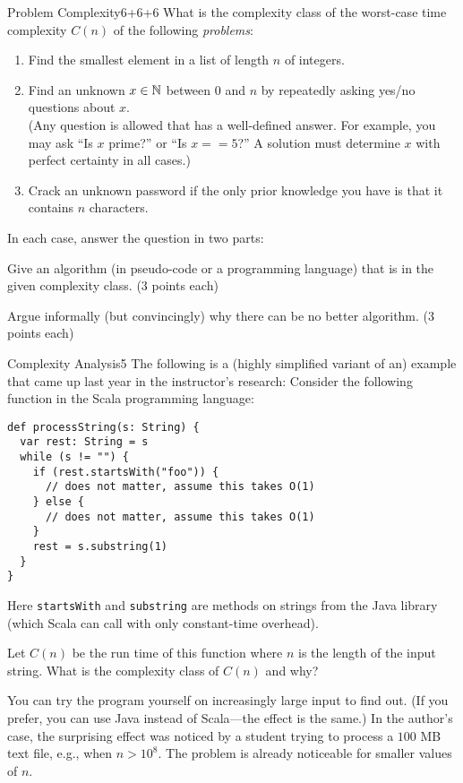 \documentclass[a4paper]{article}
\begin{document}
\header

\begin{problem}{Problem Complexity}{6+6+6}
What is the complexity class of the worst-case time complexity $C(n)$ of the following \emph{problems}:
\begin{enumerate}
\item Find the smallest element in a list of length $n$ of integers.
\item Find an unknown $x\in \mathbb{N}$ between $0$ and $n$ by repeatedly asking yes/no questions about $x$.\\
(Any question is allowed that has a well-defined answer. For example, you may ask ``Is $x$ prime?'' or ``Is $x==5$?'' A solution must determine $x$ with perfect certainty in all cases.)
\item Crack an unknown password if the only prior knowledge you have is that it contains $n$ characters.
\end{enumerate}

In each case, answer the question in two parts:
\begin{compactitem}
\item Give an algorithm (in pseudo-code or a programming language) that is in the given complexity class. (3 points each)
\item Argue informally (but convincingly) why there can be no better algorithm. (3 points each)
\end{compactitem}
\end{problem}

\begin{problem}{Complexity Analysis}{5}
The following is a (highly simplified variant of an) example that came up last year in the instructor's research:
Consider the following function in the Scala programming language:

\begin{lstlisting}
def processString(s: String) {
  var rest: String = s
  while (s != "") {
    if (rest.startsWith("foo")) {
      // does not matter, assume this takes O(1)
    } else {
      // does not matter, assume this takes O(1)
    }
    rest = s.substring(1)
  }
}
\end{lstlisting}
Here \lstinline|startsWith| and \lstinline|substring| are methods on strings from the Java library (which Scala can call with only constant-time overhead).

Let $C(n)$ be the run time of this function where $n$ is the length of the input string.
What is the complexity class of $C(n)$ and why?

You can try the program yourself on increasingly large input to find out. (If you prefer, you can use Java instead of Scala---the effect is the same.)
In the author's case, the surprising effect was noticed by a student trying to process a $100$ MB text file, e.g., when $n>10^8$. The problem is already noticeable for smaller values of $n$.
\end{problem}
\end{document}
